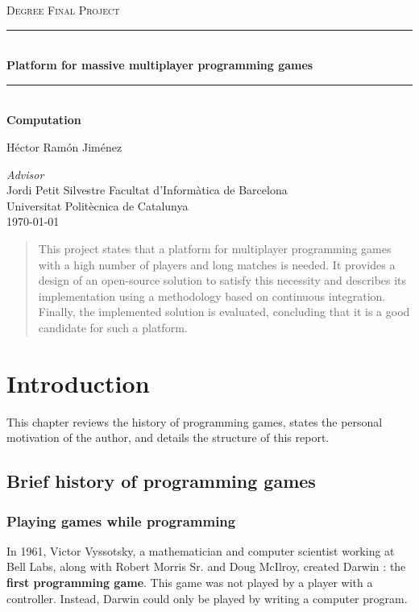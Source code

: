\documentclass[a4paper,11pt,titlepage,abstract,numbers=noenddot,automark,mnsy,intlimits,rgb,dvipsnames]{report}
\begin{document}
\begin{titlepage}
\begin{center}
\textsc{\Large Degree Final Project}
\\[1.5cm]
\rule{\linewidth}{0.5mm}
\\[0.4cm]
{\huge
\bfseries
Platform for massive multiplayer programming games
\\[0.4cm]
}
\rule{\linewidth}{0.5mm}
\\[0.3cm]
{\bfseries
Computation
}
\\[2.5cm]
\begin{center}
\large
Héctor Ramón Jiménez
\end{center}
{\small \emph{Advisor}}\\Jordi Petit Silvestre
\vfill
{\large
Facultat d'Informàtica de Barcelona\\\small Universitat Politècnica de Catalunya
}
\\[0.5cm]
{\large
\today
}
\end{center}
\end{titlepage}
\clearpage
\begin{abstract}
This project states that a platform for multiplayer programming games with a high
  number of players and long matches is needed. It provides a design of an open-source solution to satisfy this necessity
  and describes its implementation using a methodology based on continuous integration. Finally, the implemented solution
  is evaluated, concluding that it is a good candidate for such a platform.
\end{abstract}
\clearpage
\tableofcontents
\clearpage
\chapter{Introduction}
This chapter reviews the history of programming games, states the
personal motivation of the author, and details the structure of this report.
\section{Brief history of programming games}
\subsection{Playing games while programming}
In 1961, Victor Vyssotsky, a mathematician and computer scientist working at Bell Labs, along with Robert Morris Sr. and 
Doug McIlroy, created Darwin \cite{darwin}: the \textbf{first programming game}. This game was not played by a player with a controller.
Instead, Darwin could only be played by writing a computer program.
\end{document}
